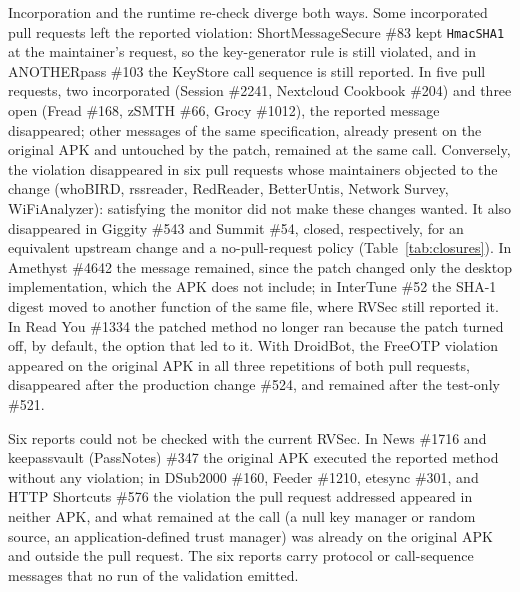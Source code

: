 \documentclass[conference]{IEEEtran}
\begin{document}
Incorporation and the runtime re-check diverge both ways. Some incorporated
pull requests left the reported violation: ShortMessageSecure \#83 kept \texttt{HmacSHA1} at the maintainer's request, so
the key-generator rule is still violated, and in ANOTHERpass \#103 the KeyStore
call sequence is still reported. In five pull requests, two incorporated (Session \#2241,
Nextcloud Cookbook \#204) and three open (Fread \#168, zSMTH \#66, Grocy
\#1012), the reported message disappeared; other messages of the same specification, already present on the
original APK and untouched by the patch, remained at the same call.
Conversely, the violation disappeared in six pull requests whose maintainers
objected to the change (whoBIRD, rssreader, RedReader, BetterUntis, Network
Survey, WiFiAnalyzer): satisfying the monitor did not make these changes
wanted. It also disappeared in Giggity \#543 and Summit \#54, closed, respectively, for an equivalent
upstream change and a no-pull-request policy (Table~\ref{tab:closures}). In
Amethyst \#4642 the message remained, since the patch changed only the desktop
implementation, which the APK does not include; in InterTune \#52 the SHA-1 digest moved to another function of the
same file, where RVSec still reported it. In Read You \#1334 the patched
method no longer ran because the patch turned off, by default, the option that
led to it.
With DroidBot, the FreeOTP violation appeared on the original APK in all
three repetitions of both pull requests, disappeared after the production
change \#524, and remained after the test-only \#521.

Six reports could not be checked with the current RVSec. In News \#1716 and
keepassvault (PassNotes) \#347 the original APK executed the reported method without any
violation; in DSub2000 \#160, Feeder \#1210, etesync \#301, and HTTP Shortcuts
\#576 the violation the pull request addressed appeared in neither APK, and
what remained at the call (a null key manager or random source, an
application-defined trust manager) was already on the original APK and outside
the pull request. The six reports carry protocol or call-sequence messages that
no run of the validation emitted.
\end{document}
